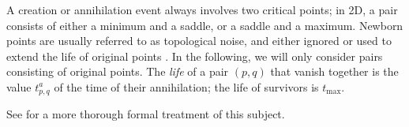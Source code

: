 A creation or annihilation event always involves two critical points; in 2D, a pair consists of either a minimum and a saddle, or  a saddle and a maximum.
Newborn points are usually referred to as topological noise, and either ignored or used to extend the life of original points \cite{Rocca:2013}.
In the following, we will only consider pairs consisting of original points.
The \emph{life} of a pair  $(p,q)$ that vanish together is the value $t^a_{p,q}$ of the time of their annihilation; the life of survivors is $t_{\max}$.
 
See \cite{Florack:2000wg} for a more thorough formal treatment of this subject. 


